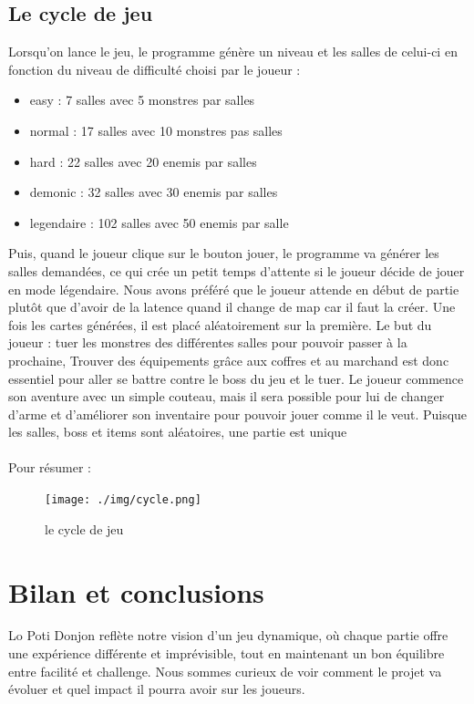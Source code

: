 \documentclass[a4paper,11pt]{article}
\begin{document}
\subsection{Le cycle de jeu}

Lorsqu'on lance le jeu, le programme génère un niveau et les salles de celui-ci en fonction du niveau de difficulté choisi par le joueur : 
\begin{itemize}
    \item easy : 7 salles avec 5 monstres par salles
    \item normal : 17 salles avec 10 monstres pas salles
    \item hard : 22 salles avec 20 enemis par salles
    \item demonic : 32 salles avec 30 enemis par salles
    \item legendaire : 102 salles avec 50 enemis par salle
\end{itemize}
Puis, quand le joueur clique sur le bouton jouer, le programme va générer les salles demandées, ce qui crée un petit temps d'attente si le joueur décide de jouer en mode légendaire.
Nous avons préféré que le joueur attende en début de partie plutôt que d'avoir de la latence quand il change de map car il faut la créer.
Une fois les cartes générées, il est placé aléatoirement sur la première. Le but du joueur : tuer les monstres des différentes salles pour pouvoir passer à la prochaine, 
Trouver des équipements grâce aux coffres et au marchand  est donc essentiel  pour aller se battre contre le boss du jeu et le tuer.
Le joueur commence son aventure avec un simple couteau, mais il sera possible pour lui de changer d'arme et d'améliorer son inventaire pour pouvoir jouer comme il le veut. Puisque les salles, boss et items sont aléatoires, une partie est unique
\\\\
Pour résumer : 
\begin{figure}[h] 
    \centering 
    \texttt{[image: ./img/cycle.png]} 
    \caption{le cycle de jeu} 
\end{figure} 

\section{Bilan et conclusions}

Lo Poti Donjon reflète notre vision d'un jeu dynamique, où chaque partie offre une expérience différente et imprévisible, tout en maintenant un bon équilibre entre facilité et challenge. Nous sommes curieux de voir comment le projet va évoluer et quel impact il pourra avoir sur les joueurs.
\end{document}
